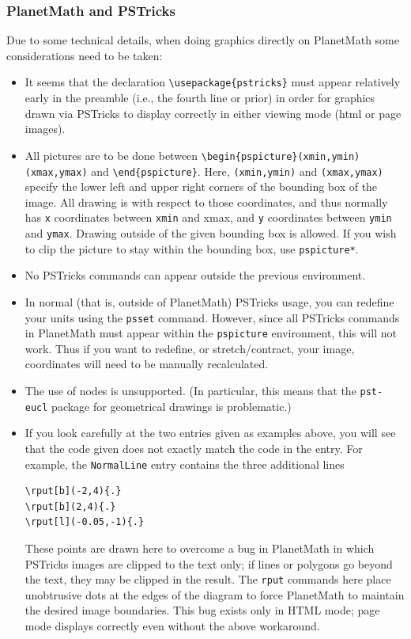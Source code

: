 \subsubsection{PlanetMath and PSTricks}

Due to some technical details, when doing graphics directly on PlanetMath some considerations need to be taken:
\begin{itemize}
\item It seems that the declaration \verb+\usepackage{pstricks}+ must appear relatively early in the preamble (i.e., the fourth line or prior) in order for graphics drawn via PSTricks to display correctly in either viewing mode (html or page images).
\item All pictures are to be done between \verb+\begin{pspicture}(xmin,ymin)(xmax,ymax)+
and \verb+\end{pspicture}+. Here, \verb+(xmin,ymin)+ and \verb+(xmax,ymax)+ specify the lower left and upper right corners of the bounding box of the image. All drawing is with respect to those coordinates, and thus normally has \verb+x+ coordinates between \verb+xmin+ and xmax, and \verb+y+ coordinates between \verb+ymin+ and \verb+ymax+. Drawing outside of the given bounding box is allowed. If you wish to clip the picture to stay within the bounding box, use \verb+pspicture*+.
\item No PSTricks commands can appear outside the previous environment.
\item In normal (that is, outside of PlanetMath) PSTricks usage, you can redefine your units using the \texttt{psset} command. However, since all PSTricks commands in PlanetMath must appear within the \texttt{pspicture} environment, this will not work. Thus if you want to redefine, or stretch/contract, your image, coordinates will need to be manually recalculated.
\item The use of nodes is unsupported. (In particular, this means that the \texttt{pst-eucl} package for geometrical drawings is problematic.)
\item If you look carefully at the two entries given as examples above, you will see that the code given does not exactly match the code in the entry. For example, the \texttt{NormalLine} entry contains the three additional lines
\begin{Verbatim}
\rput[b](-2,4){.}
\rput[b](2,4){.}
\rput[l](-0.05,-1){.}
\end{Verbatim}
These points are drawn here to overcome a bug in PlanetMath in which PSTricks images are clipped to the text only; if lines or polygons go beyond the text, they may be clipped in the result. The \texttt{rput} commands here place unobtrusive dots at the edges of the diagram to force PlanetMath to maintain the desired image boundaries. This bug exists only in HTML mode; page mode displays correctly even without the above workaround.
\end{itemize}

